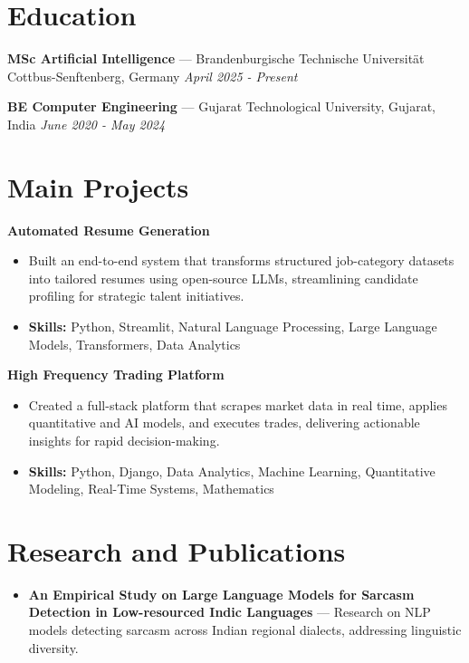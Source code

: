 \documentclass[a4paper,10pt]{article}
\begin{document}
\section*{Education}
\textbf{MSc Artificial Intelligence} — Brandenburgische Technische Universität Cottbus-Senftenberg, Germany \hfill \textit{April 2025 - Present}\par
\vspace{1.5pt}
\textbf{BE Computer Engineering} — Gujarat Technological University, Gujarat, India \hfill \textit{June 2020 - May 2024}\par

\section*{Main Projects}
\textbf{Automated Resume Generation}\par
\vspace{1pt}
\begin{itemize}
  \item Built an end-to-end system that transforms structured job-category datasets into tailored resumes using open-source LLMs, streamlining candidate profiling for strategic talent initiatives.
  \item \textbf{Skills:} Python, Streamlit, Natural Language Processing, Large Language Models, Transformers, Data Analytics
\end{itemize}
\vspace{3pt}
\textbf{High Frequency Trading Platform}\par
\vspace{1pt}
\begin{itemize}
  \item Created a full-stack platform that scrapes market data in real time, applies quantitative and AI models, and executes trades, delivering actionable insights for rapid decision-making.
  \item \textbf{Skills:} Python, Django, Data Analytics, Machine Learning, Quantitative Modeling, Real-Time Systems, Mathematics
\end{itemize}

\section*{Research and Publications}
\begin{itemize}
\item \textbf{An Empirical Study on Large Language Models for Sarcasm Detection in Low-resourced Indic Languages} — Research on NLP models detecting sarcasm across Indian regional dialects, addressing linguistic diversity.
\end{itemize}
\end{document}
